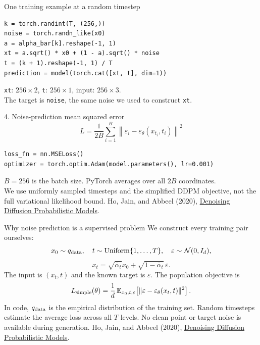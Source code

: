 \documentclass[aspectratio=169,11pt]{beamer}
\newcommand{\ddpmref}{\vfill{\tiny\color{gray}Ho, Jain, and Abbeel (2020), \href{https://arxiv.org/abs/2006.11239}{Denoising Diffusion Probabilistic Models}.}}
\begin{document}
\begin{frame}[fragile]{One training example at a random timestep}
\begin{lstlisting}[basicstyle=\ttfamily\footnotesize]
k = torch.randint(T, (256,))
noise = torch.randn_like(x0)
a = alpha_bar[k].reshape(-1, 1)
xt = a.sqrt() * x0 + (1 - a).sqrt() * noise
t = (k + 1).reshape(-1, 1) / T
prediction = model(torch.cat([xt, t], dim=1))
\end{lstlisting}
\par\vspace{4mm}
\texttt{xt}: $256\times2$, \texttt{t}: $256\times1$, input: $256\times3$.\\[3mm]
The target is \texttt{noise}, the same noise we used to construct \texttt{xt}.
\end{frame}

\begin{frame}[fragile]{4. Noise-prediction mean squared error}
\large
\[L=\frac{1}{2B}\sum_{i=1}^B
\left\|\varepsilon_i-\varepsilon_\theta(x_{t_i},t_i)\right\|^2\]
\normalsize
\begin{lstlisting}
loss_fn = nn.MSELoss()
optimizer = torch.optim.Adam(model.parameters(), lr=0.001)
\end{lstlisting}
\par\vspace{3mm}
$B=256$ is the batch size. PyTorch averages over all $2B$ coordinates.\\[3mm]
We use uniformly sampled timesteps and the simplified DDPM objective, not the full variational likelihood bound.
\ddpmref
\end{frame}

\begin{frame}{Why noise prediction is a supervised problem}
We construct every training pair ourselves:
\[x_0\sim q_{\rm data},\quad t\sim\operatorname{Uniform}\{1,\ldots,T\},
\quad\varepsilon\sim\mathcal N(0,I_d),\]
\[x_t=\sqrt{\bar\alpha_t}x_0+\sqrt{1-\bar\alpha_t}\,\varepsilon.
\]
The input is $(x_t,t)$ and the known target is $\varepsilon$. The population objective is
\[L_{\rm simple}(\theta)=\frac1d\,
\mathbb E_{x_0,t,\varepsilon}\!\left[\|\varepsilon-\varepsilon_\theta(x_t,t)\|^2\right].\]
\small
In code, $q_{\rm data}$ is the empirical distribution of the training set. Random timesteps estimate the average loss across all $T$ levels. No clean point or target noise is available during generation.
\ddpmref
\end{frame}
\end{document}
